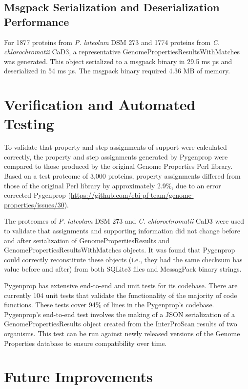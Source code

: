 \subsection{Msgpack Serialization and Deserialization Performance} \label{messagepack-performance}

For 1877 proteins from \textit{P. luteolum} DSM 273 and 1774 proteins from \textit{C. chlorochromatii} CaD3, a representative GenomePropertiesResultsWithMatches was generated. This object serialized to a msgpack binary in 29.5 ms  µs and deserialized in 54 ms  µs. The msgpack binary required 4.36 MB of memory.

\section{Verification and Automated Testing}

To validate that property and step assignments of support were calculated correctly, the property and step assignments generated by Pygenprop were compared to those produced by the original Genome Properties Perl library. Based on a test proteome of 3,000 proteins, property assignments differed from those of the original Perl library by approximately 2.9\%, due to an error corrected Pygenprop (\href{https://github.com/ebi-pf-team/genome-properties/issues/30}{https://github.com/ebi-pf-team/genome-properties/issues/30}).

The proteomes of \textit{P. luteolum} DSM 273 and \textit{C. chlorochromatii} CaD3 were used to validate that assignments and supporting information did not change before and after serialization of GenomePropertiesResults and GenomePropertiesResultsWithMatches objects. It was found that Pygenprop could correctly reconstitute these objects (i.e., they had the same checksum has value before and after) from both SQLite3 files and MessagPack binary strings.

Pygenprop has extensive end-to-end and unit tests for its codebase. There are currently 104 unit tests that validate the functionality of the majority of code functions. These tests cover 94\% of lines in the Pygenprop's codebase. Pygenprop's end-to-end test involves the making of a JSON serialization of a GenomePropertiesResults object created from the InterProScan results of two organisms. This test can be run against newly released versions of the Genome Properties database to ensure compatibility over time. 

\section{Future Improvements}

